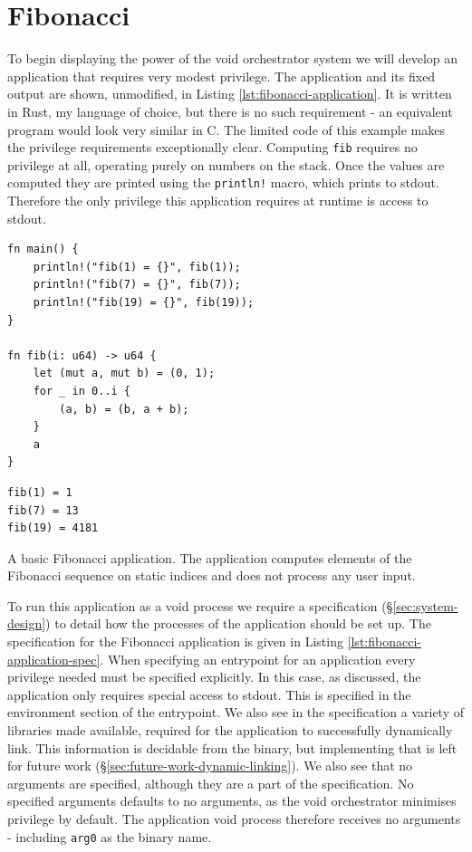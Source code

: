 \documentclass[12pt,a4paper,twoside]{report}
\begin{document}
\section{Fibonacci}
\label{sec:building-fib}

To begin displaying the power of the void orchestrator system we will develop an application that requires very modest privilege. The application and its fixed output are shown, unmodified, in Listing \ref{lst:fibonacci-application}. It is written in Rust, my language of choice, but there is no such requirement - an equivalent program would look very similar in C. The limited code of this example makes the privilege requirements exceptionally clear. Computing \texttt{fib} requires no privilege at all, operating purely on numbers on the stack. Once the values are computed they are printed using the \texttt{println!} macro, which prints to stdout. Therefore the only privilege this application requires at runtime is access to stdout.

\begin{listing}
\begin{verbatim}
fn main() {
    println!("fib(1) = {}", fib(1));
    println!("fib(7) = {}", fib(7));
    println!("fib(19) = {}", fib(19));
}

fn fib(i: u64) -> u64 {
    let (mut a, mut b) = (0, 1);
    for _ in 0..i {
        (a, b) = (b, a + b);
    }
    a
}
\end{verbatim}
\begin{verbatim}
fib(1) = 1
fib(7) = 13
fib(19) = 4181
\end{verbatim}

\caption{A basic Fibonacci application. The application computes elements of the Fibonacci sequence on static indices and does not process any user input.}
\label{lst:fibonacci-application}
\end{listing}

To run this application as a void process we require a specification (§\ref{sec:system-design}) to detail how the processes of the application should be set up. The specification for the Fibonacci application is given in Listing \ref{lst:fibonacci-application-spec}. When specifying an entrypoint for an application every privilege needed must be specified explicitly. In this case, as discussed, the application only requires special access to stdout. This is specified in the environment section of the entrypoint. We also see in the specification a variety of libraries made available, required for the application to successfully dynamically link. This information is decidable from the binary, but implementing that is left for future work (§\ref{sec:future-work-dynamic-linking}). We also see that no arguments are specified, although they are a part of the specification. No specified arguments defaults to no arguments, as the void orchestrator minimises privilege by default. The application void process therefore receives no arguments - including \texttt{arg0} as the binary name.
\end{document}
